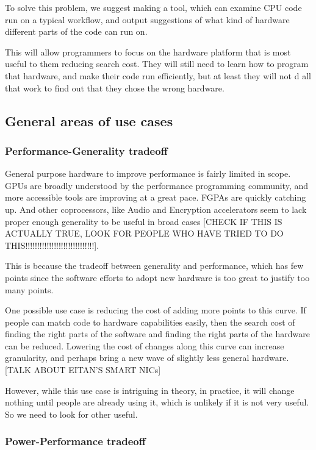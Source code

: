 \documentclass[12pt,twoside]{reedthesis}
\begin{document}
		To solve this problem, we suggest making a tool, which can examine CPU code run on a typical workflow, and output suggestions of what kind of hardware different parts of the code can run on.

		This will allow programmers to focus on the hardware platform that is most useful to them reducing search cost. They will still need to learn how to program that hardware, and make their code run efficiently, but at least they will not d all that work to find out that they chose the wrong hardware.

		\subsection{General areas of use cases}

		\subsubsection{Performance-Generality tradeoff}

		General purpose hardware to improve performance is fairly limited in scope. GPUs are broadly understood by the performance programming community, and more accessible tools are improving at a great pace. FGPAs are quickly catching up. And other coprocessors, like Audio and Encryption accelerators seem to lack proper enough generality to be useful in broad cases [CHECK IF THIS IS ACTUALLY TRUE, LOOK FOR PEOPLE WHO HAVE TRIED TO DO THIS!!!!!!!!!!!!!!!!!!!!!!!!!!!!!].

		This is because the tradeoff between generality and performance, which has few points since the software efforts to adopt new hardware is too great to justify too many points.

		One possible use case is reducing the cost of adding more points to this curve. If people can match code to hardware capabilities easily, then the search cost of finding the right parts of the software and finding the right parts of the hardware can be reduced. Lowering the cost of changes along this curve can increase granularity, and perhaps bring a new wave of slightly less general hardware. [TALK ABOUT EITAN'S SMART NICs]

		However, while this use case is intriguing in theory, in practice, it will change nothing until people are already using it,  which is unlikely if it is not very useful. So we need to look for other useful.

		\subsubsection{Power-Performance tradeoff}
\end{document}
